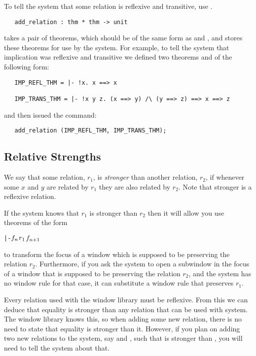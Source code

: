 To tell the system that some relation is reflexive and transitive, use
.
\begin{boxed}\begin{verbatim}
   add_relation : thm * thm -> unit
\end{verbatim}\end{boxed}
 takes a pair of theorems, which should be of the same form
as  and , and stores these theorems for use by
the system.
For example, to tell the system that implication was reflexive and transitive
we defined two theorems
and
of the following form:
\begin{verbatim}
   IMP_REFL_THM = |- !x. x ==> x

   IMP_TRANS_THM = |- !x y z. (x ==> y) /\ (y ==> z) ==> x ==> z
\end{verbatim}
and then issued the command:
\begin{verbatim}
   add_relation (IMP_REFL_THM, IMP_TRANS_THM);
\end{verbatim}

\subsection{Relative Strengths}

We say that some relation, $r_1$,
is {\it stronger}\/ than another relation, $r_2$, 
if whenever some $x$ and $y$ are related by $r_1$
they are also related by $r_2$.
Note that stronger is a reflexive relation.

If the system knows that $r_1$ is stronger than $r_2$ then
it will allow you use theorems of the form 
\begin{alltt}
   |- \(f\sb{n}\) \(r\sb{1}\) \(f\sb{n+1}\)
\end{alltt}
to transform the focus of a window which is supposed to be preserving
the relation $r_2$.
Furthermore, if you ask the system to open a subwindow 
in the focus of a window that is supposed to be preserving the relation
$r_2$, and the system has no window rule for that case, it can substitute
a window rule that preserves $r_1$.

Every relation used with the window library must be reflexive.
From this we can deduce that equality is stronger than any relation that can be
used with system.
The window library knows this, so when adding some new relation,
there is no need to state that equality is stronger than it.
However, if you plan on adding two new relations to the system,
say  and , such that  is stronger than ,
you will need to tell the system about that.

